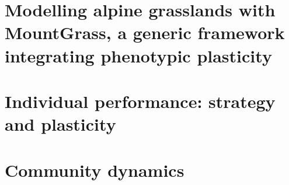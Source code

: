 \documentclass[a4paper, notoc, justified,marginals=left, nobib]{tufte-book}
\newcommand{\model}{\textit{\texttt{MountGrass}}}
\begin{document}
\part{Modelling alpine grasslands with MountGrass, a generic framework integrating phenotypic plasticity}\label{part:model}
\setcounter{chapter}{0}
\begin{refsection}

%




\begin{fullwidth}
\printbibliography[heading=bibliography] 
\end{fullwidth}
\end{refsection}


\part{Individual performance: strategy and plasticity}\label{part:individuals}

\begin{refsection}
\setcounter{chapter}{0}


\begin{fullwidth}
\printbibliography[heading=bibliography] 
\end{fullwidth}
\end{refsection}

\part{Community dynamics}\label{part:community}

\begin{refsection}
\setcounter{chapter}{0}


\begin{fullwidth}
\printbibliography[heading=bibliography] 
\end{fullwidth}
\end{refsection}
\end{document}
